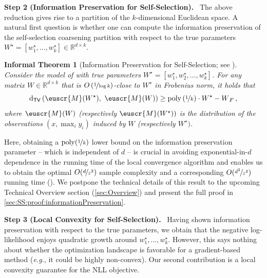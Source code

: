 \documentclass[11pt,letterpaper]{article}
\theoremstyle{plain}
\newtheorem{inftheorem}{Informal Theorem}
\theoremstyle{definition}
\theoremstyle{remark}
\newcommand{\inparen}[1]{\ensuremath{\left(#1\right)}}
\let\norm\relax
\newcommand{\norm}[1]{\ensuremath{\left\lVert #1 \right\rVert}}
\newcommand{\R}{\mathbb{R}}
\newcommand{\tv}[2]{\operatorname{d}_{\mathsf{TV}}{\inparen{#1,#2}}}
\newcommand{\nfrac}[2]{\nicefrac{#1}{#2}}
\newcommand{\poly}{\mathrm{poly}}
\newcommand{\eps}{\varepsilon}
\newcommand{\customcal}[1]{\euscr{#1}}
\newcommand{\cM}{\customcal{M}}
\renewcommand{\paragraph}[1]{\medskip \noindent\textbf{#1}~}
\newcommand{\eg}{\emph{e.g.}}
\newcommand{\Wstar}{{W^\star}}
\begin{document}
\paragraph{Step 2 (Information Preservation for Self-Selection).} The above reduction gives rise to a partition of the $k$-dimensional Euclidean space. A natural first question is whether one can compute the information preservation of the self-selection coarsening partition with respect to the true parameters $W^\star = [w_1^\star, \dots, w_k^\star] \in \R^{d \times k}.$ 

\begin{inftheorem}
[Information Preservation for Self-Selection; see ]
Consider the model of   with true parameters $W^\star = [w_1^\star,w_2^\star,\dots,w_k^\star]$. For any matrix $W\in \R^{d\times k}$ that is $O\inparen{\nfrac{1}{\log{k}}}$-close to $\Wstar$ in Frobenius norm, it holds that
            \[
                \tv{\cM(W^\star)}{~\cM(W)} \geq 
                    \poly\inparen{\nfrac{1}{k}}
                    \cdot 
                        {\norm{W^\star - W}_F}
                        \,,
            \]
where $\cM(W)$ (respectively $\cM(W^\star))$ is the distribution of {the observations} ${(x,\max_i y_i)}$ induced by $W$ (respectively $W^\star)$. 
\label{thm:InfoPresSelfSelection}
\end{inftheorem}
\noindent Here, obtaining a $\poly(\nfrac{1}{k})$ lower bound on the information preservation parameter
-- which is independent of $d$ -- is crucial in avoiding exponential-in-$d$ dependence in the running time of the local convergence algorithm {and enables us to obtain the optimal 
$O(\nfrac{d}{\eps^2})$ sample complexity and {a corresponding} $O(\nfrac{d^2}{\eps^2})$ running time} ().
We postpone the technical details of this result to the upcoming Technical Overview section (\cref{sec:Overview}) and present the full proof in \cref{sec:SS:proof:informationPreservation}.

\paragraph{Step 3 (Local Convexity for Self-Selection).} Having shown information preservation with respect to the true parameters, we obtain that the negative log-likelihood enjoys quadratic growth around $w_1^\star,\dots,w_k^\star.$ However, this says nothing about whether the optimization landscape is favorable for a gradient-based method (\eg{}, it could be highly non-convex). Our second contribution is a local convexity guarantee for the NLL objective. 
\end{document}
